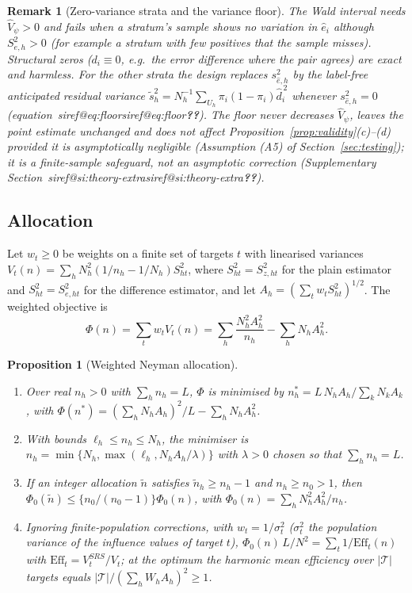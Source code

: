 \documentclass[pdflatex,sn-mathphys-num,iicol]{sn-jnl}
\makeatletter
\theoremstyle{thmstyleone}
\newtheorem{proposition}{Proposition}
\theoremstyle{thmstyletwo}
\newtheorem{remark}{Remark}
\theoremstyle{thmstylethree}
\newcommand{\SIref}[1]{\ifcsname siref@#1\endcsname\csname siref@#1\endcsname\else\textbf{??}\fi}
\makeatother
\begin{document}
\begin{remark}[Zero-variance strata and the variance floor]\label{rem:zero-var}
The Wald interval needs $\hat V_\psi>0$ and fails when a stratum's sample shows no variation in $\hat e_i$ although $S^2_{e,h}>0$ (for example a stratum with
few positives that the sample misses). Structural zeros ($d_i\equiv0$, e.g.\ the error difference where the pair agrees) are exact and harmless. For the other strata the
design replaces $s^2_{\hat e,h}$ by the label-free anticipated residual variance $\tilde s^2_h=N_h^{-1}\sum_{U_h}\pi_i(1-\pi_i)\hat d_i^{\,2}$
whenever $s^2_{\hat e,h}=0$ (equation~\SIref{eq:floor}). The floor never decreases $\hat V_\psi$, leaves the point estimate unchanged and does not
affect Proposition~\ref{prop:validity}(c)--(d) provided it is asymptotically negligible (Assumption (A5) of Section~\ref{sec:testing}); it is a finite-sample safeguard, not an asymptotic correction (Supplementary Section~\SIref{si:theory-extra}).
\end{remark}

\subsection{Allocation}\label{sec:theory-alloc}

Let $w_t\ge0$ be weights on a finite set of targets $t$ with linearised variances $V_t(n)=\sum_hN_h^2(1/n_h-1/N_h)S^2_{ht}$, where $S^2_{ht}=S^2_{z,ht}$ for the plain estimator
and $S^2_{ht}=S^2_{e,ht}$ for the difference estimator, and let $A_h=(\sum_tw_tS^2_{ht})^{1/2}$. The weighted objective is
\begin{equation}\label{eq:objective}
\Phi(n)=\sum_tw_tV_t(n)=\sum_h\frac{N_h^2A_h^2}{n_h}-\sum_hN_hA_h^2 .
\end{equation}

\begin{proposition}[Weighted Neyman allocation]\label{prop:allocation}
\begin{enumerate}
\item[(a)] Over real $n_h>0$ with $\sum_hn_h=L$, $\Phi$ is minimised by
$n_h^\ast=L\,N_hA_h/\sum_kN_kA_k$, with $\Phi(n^\ast)=(\sum_hN_hA_h)^2/L-\sum_hN_hA_h^2$.
\item[(b)] With bounds $\ell_h\le n_h\le N_h$, the minimiser is $n_h=\min\{N_h,\max(\ell_h,N_hA_h/\lambda)\}$ with
$\lambda>0$ chosen so that $\sum_hn_h=L$.
\item[(c)] If an integer allocation $\tilde n$ satisfies $\tilde n_h\ge n_h-1$ and $n_h\ge n_0>1$, then $\Phi_0(\tilde n)\le\{n_0/(n_0-1)\}\Phi_0(n)$, with
$\Phi_0(n)=\sum_hN_h^2A_h^2/n_h$.
\item[(d)] Ignoring finite-population corrections, with $w_t=1/\sigma^2_t$ ($\sigma^2_t$ the population variance of the influence values of target $t$),
$\Phi_0(n)\,L/N^2=\sum_t1/\mathrm{Eff}_t(n)$ with $\mathrm{Eff}_t=V^{SRS}_t/V_t$; at the optimum the harmonic mean efficiency over $|\mathcal T|$ targets equals
$|\mathcal T|/(\sum_hW_hA_h)^2\ge1$.
\end{enumerate}
\end{proposition}
\end{document}
